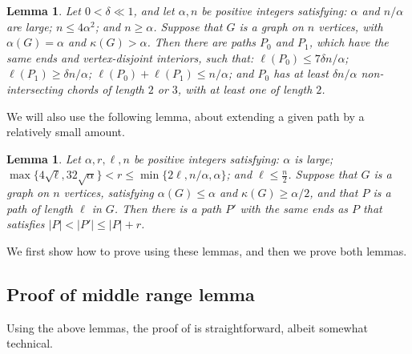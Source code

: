 \documentclass[11pt,english]{article}
\theoremstyle{plain}
\newtheorem{lemma}[theorem]{Lemma}
\theoremstyle{definition}
\theoremstyle{remark}
\begin{document}
		\begin{lemma} \label{lem:n-over-alpha}
			Let $0 < \delta \ll 1$, and let $\alpha, n$ be positive integers satisfying: $\alpha$ and $n/\alpha$ are large; $n \le 4\alpha^2$; and $n \ge \alpha$.
			Suppose that $G$ is a graph on $n$ vertices, with $\alpha(G) = \alpha$ and $\kappa(G) > \alpha$.
			Then there are paths $P_0$ and $P_1$, which have the same ends and vertex-disjoint interiors, such that: $\ell(P_0) \le 7\delta n / \alpha$; $\ell(P_1) \ge \delta n / \alpha$; $\ell(P_0) + \ell(P_1) \le n/\alpha$; and $P_0$ has at least $\delta n / \alpha$ non-intersecting chords of length $2$ or $3$, with at least one of length $2$. 
		\end{lemma}

		We will also use the following lemma, about extending a given path by a relatively small amount.

		\begin{lemma}\label{lem:mid-range}
			Let $\alpha, r, \ell, n$ be positive integers satisfying: $\alpha$ is large; $\max\{4\sqrt{\ell}, 32 \sqrt{\alpha}\} < r \le \min\{2\ell, n/\alpha, \alpha\}$; and $\ell \le \frac{n}{2}$.
			Suppose that $G$ is a graph on $n$ vertices, satisfying $\alpha(G) \le \alpha$ and $\kappa(G) \ge \alpha/2$, and that $P$ is a path of length $\ell$ in $G$. Then there is a path $P'$ with the same ends as $P$ that satisfies $|P| < |P'| \le |P| + r$.
		\end{lemma}

		We first show how to prove  using these lemmas, and then we prove both lemmas.

	\subsection{Proof of middle range lemma}

		Using the above lemmas, the proof of  is straightforward, albeit somewhat technical.
\end{document}
